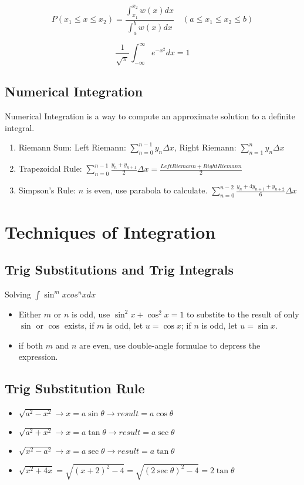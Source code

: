 \documentclass{article}
\newcommand\defint[3]{\int_{#1}^{#2}#3dx}
\begin{document}
$$P(x_1 \le x \le x_2) = \frac{\defint{x_1}{x_2}{w(x)}}{\defint{a}{b}{w(x)}} \quad (a \le x_1 \le x_2 \le b)$$

$$\frac{1}{\sqrt{\pi}}\defint{-\infty}{\infty}{e^{-x^2}} = 1$$

\subsection{Numerical Integration}
Numerical Integration is a way to compute an approximate solution to a definite integral.
\begin{enumerate}
  \item Riemann Sum: Left Riemann: $\sum\limits_{n=0}^{n-1}y_n\Delta x$, Right Riemann: $\sum\limits_{n=1}^{n}y_n\Delta x$
  \item Trapezoidal Rule: $\sum\limits_{n=0}^{n-1}\frac{y_n+y_{n+1}}{2}\Delta x = \frac{Left Riemann+ Right Riemann}{2}$
  \item Simpson’s Rule: $n$ is even, use parabola to calculate. $\sum\limits_{n=0}^{n-2}\frac{y_n+4y_{n+1}+y_{n+2}}{6}\Delta x$
\end{enumerate}

\section{Techniques of Integration}
\subsection{Trig Substitutions and Trig Integrals}

Solving $\int\sin^mxcos^nxdx$

\begin{itemize}
  \item Either $m$ or $n$ is odd, use $\sin^2x + \cos^2x = 1$ to substite to the result of only $\sin$ or $\cos$ exists, if $m$ is odd, let $u = \cos x$; if $n$ is odd, let $u = \sin x$.
  \item if both $m$ and $n$ are even, use double-angle formulae to depress the expression.
\end{itemize}

\subsection{Trig Substitution Rule}
\begin{itemize}
  \item $\sqrt{a^2-x^2} \rightarrow x = a\sin \theta \rightarrow result = a\cos \theta$
  \item $\sqrt{a^2+x^2} \rightarrow x = a\tan \theta \rightarrow result = a\sec \theta$
  \item $\sqrt{x^2-a^2} \rightarrow x = a\sec \theta \rightarrow result = a\tan \theta$
  \item $\sqrt{x^2+4x} = \sqrt{(x+2)^2-4} = \sqrt{(2\sec \theta)^2-4} = 2\tan \theta$
\end{itemize}
\end{document}
